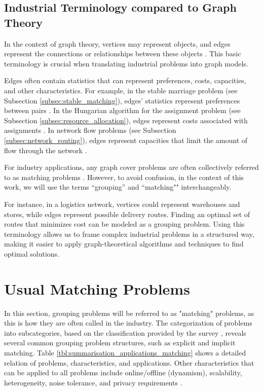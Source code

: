     \subsection{Industrial Terminology compared to Graph Theory}
    
   In the context of graph theory, vertices may represent objects, and edges represent the connections or relationships between these objects \cite{west2001introduction, diestel2017graph}. 
    This basic terminology is crucial when translating industrial problems into graph models.

    Edges often contain statistics that can represent preferences, costs, capacities, and other characteristics.
    For example, in the stable marriage problem  (see Subsection \ref{subsec:stable_matching}), edges' statistics represent preferences between pairs \cite{gale1962college}.
    In the Hungarian algorithm for the assignment problem  (see Subsection \ref{subsec:resource_allocation}), edges represent costs associated with assignments \cite{kuhn1955hungarian}. 
    In network flow problems (see Subsection \ref{subsec:network_routing}), edges represent capacities that limit the amount of flow through the network \cite{ford1956maximal}.
    
    For industry applications, any graph cover problems are often collectively referred to as matching problems \cite{larman2004applying, fowler2003patterns}. However, to avoid confusion, in the context of this work, we will use the terms ``grouping'' and ``matching"" interchangeably.

    For instance, in a logistics network, vertices could represent warehouses and stores, while edges represent possible delivery routes. 
    Finding an optimal set of routes that minimizes cost can be modeled as a grouping problem.
    Using this terminology allows us to frame complex industrial problems in a structured way, making it easier to apply graph-theoretical algorithms and techniques to find optimal solutions.
    
    
    \section{Usual Matching Problems}
        
        In this section, grouping problems will be referred to as "matching" problems, as this is how they are often called in the industry. The categorization of problems into subcategories, based on the classification provided by the survey \cite{ieee_survey}, reveals several common grouping problem structures, such as explicit and implicit matching. Table \ref{tbl:summarisation_applications_matching} shows a detailed relation of problems, characteristics, and applications. Other characteristics that can be applied to all problems include online/offline (dynamism), scalability, heterogeneity, noise tolerance, and privacy requirements \cite{ieee_survey}.
        
